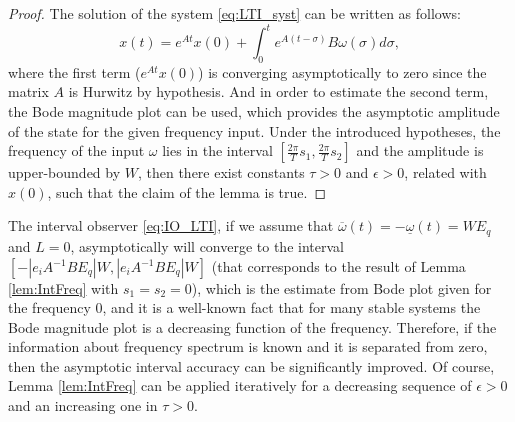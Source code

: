 \documentclass[letterpaper, 10 pt, conference]{ieeeconf}
\theoremstyle{plain}
\theoremstyle{definition}
\theoremstyle{plain}
\theoremstyle{plain}
\theoremstyle{remark}
\begin{document}
\begin{proof}
The solution of the system \eqref{eq:LTI_syst} can be written as follows:
\[
x(t)=e^{At}x(0)+\int_{0}^{t}e^{A(t-\sigma)}B\omega(\sigma)d\sigma,
\]
where the first term ($e^{At}x(0)$) is converging asymptotically to zero since the matrix $A$ is Hurwitz by hypothesis. And in order to estimate the second term, the Bode magnitude plot can be used, which provides the asymptotic amplitude of the state for the given frequency input. Under the introduced hypotheses, the frequency of the input $\omega$ lies in the interval $[\frac{2\pi}{T}s_{1},\frac{2\pi}{T}s_{2}]$ and the amplitude is upper-bounded by $W$, then there exist constants $\tau>0$ and $\epsilon>0$, related with $x(0)$, such that the claim of the lemma is true.
\end{proof}
The interval observer \eqref{eq:IO_LTI}, if we assume that $\overline{\omega}(t)=-\underline{\omega}(t)=WE_{q}$ and $L=0$, asymptotically will converge to the interval $[-|e_{i}A{}^{-1}BE_{q}|W,|e_{i}A{}^{-1}BE_{q}|W]$ (that corresponds to the result of Lemma \ref{lem:IntFreq} with $s_{1}=s_{2}=0$), which is the estimate from Bode plot given for the frequency $0$, and it is a well-known fact that for many stable systems the Bode magnitude plot is a decreasing function of the frequency. Therefore, if the information about frequency spectrum is known and it is separated from zero, then the asymptotic interval accuracy can be significantly improved. Of course, Lemma \ref{lem:IntFreq} can be applied iteratively for a decreasing sequence of $\epsilon>0$ and an increasing one in $\tau>0$.
\end{document}
